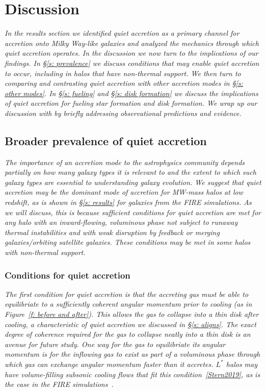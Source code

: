 \documentclass[fleqn,usenatbib]{mnras}
\begin{document}
\section{Discussion}
\label{s: discussion}

\textit{
In the results section we identified quiet accretion as a primary channel for accretion onto Milky Way-like galaxies and analyzed the mechanics through which quiet accretion operates.
In the discussion we now turn to the implications of our findings.
In \S\ref{s: prevalence} we discuss conditions that may enable quiet accretion to occur, including in halos that have non-thermal support.
We then turn to comparing and contrasting quiet accretion with other accretion modes in \S\ref{s: other modes}.
In \S\ref{s: fueling} and \S\ref{s: disk formation} we discuss the implications of quiet accretion for fueling star formation and disk formation.
We wrap up our discussion with by briefly addressing observational predictions and evidence.
}

\subsection{Broader prevalence of quiet accretion}
\label{s: broader prevalence}

\textit{
The importance of an accretion mode to the astrophysics community depends partially on how many galaxy types it is relevant to and the extent to which such galaxy types are essential to understanding galaxy evolution.
We suggest that quiet accretion may be the dominant mode of accretion for MW-mass halos at low redshift, as is shown in \S\ref{s: results} for galaxies from the FIRE simulations.
As we will discuss, this is because sufficient conditions for quiet accretion are met for any halo with an inward-flowing, voluminous phase not subject to runaway thermal instabilities and with weak disruption by feedback or merging galaxies/orbiting satellite galaxies.
These conditions may be met in some halos with non-thermal support.
}

\subsubsection{Conditions for quiet accretion}
\label{s: broader prevalence -- conditions}

\textit{
The first condition for quiet accretion is that the accreting gas must be able to equilibriate to a sufficiently coherent angular momentum prior to cooling (as in Figure~\ref{f: before and after}).
This allows the gas to collapse into a thin disk after cooling, a characteristic of quiet accretion we discussed in \S\ref{s: aligns}.
The exact degree of coherence required for the gas to collapse neatly into a thin disk is an avenue for future study.
One way for the gas to equilibriate its angular momentum is for the inflowing gas to exist as part of a voluminous phase through which gas can exchange angular momentum faster than it accretes.
$L^*$ halos may have volume-filling subsonic cooling flows that fit this condition~\ref{Stern2019}, as is the case in the FIRE simulations~\citep{Stern2020a}.
}
\end{document}
